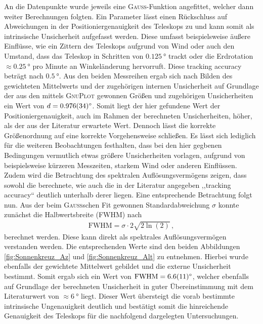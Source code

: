     An die Datenpunkte wurde jeweils eine \textsc{Gauß}-Funktion angefittet, welcher dann weiter Berechnungen folgten.
    Ein Parameter lässt einen Rückschluss auf Abweichungen in der Positioniergenauigkeit des Teleskops zu und kann somit als intrinsische Unsicherheit aufgefasst werden.
    Diese umfasst beispielsweise äußere Einflüsse, wie ein Zittern des Teleskops aufgrund von Wind oder auch den Umstand, dass das Teleskop in Schritten von $\SI{0.125}{\degree}$ trackt \cite{Usermanual} oder die Erdrotation $\approx \SI{0.25}{\degree}$ pro Minute an Winkeländerung hervorruft.
    Diese \dq tracking accuracy\dq{} beträgt nach \cite{Usermanual} $\SI{0.5}{\degree}$. 
    Aus den beiden Messreihen ergab sich nach Bilden des gewichteten Mittelwerts und der zugehörigen internen Unsicherheit auf Grundlage der aus den mittels \textsc{GnuPlot} gewonnen Größen und zugehörigen Unsicherheiten ein Wert von $d = \SI{0.976 \pm 0.034}{\degree}$.
    Somit liegt der hier gefundene Wert der Positioniergenauigkeit, auch im Rahmen der berechneten Unsicherheiten, höher, als der aus der Literatur erwartete Wert. 
    Dennoch lässt die korrekte Größenordnung auf eine korrekte Vorgehensweise schließen.
    Es lässt sich lediglich für die weiteren Beobachtungen festhalten, dass bei den hier gegbenen Bedingungen vermutlich etwas größere Unsicherheiten vorlagen, aufgrund von beispielsweise kürzeren Messzeiten, starkem Wind oder anderen Einflüssen.\\ 


    Zudem wird die Betrachtung des spektralen Auflösungsvermögens zeigen, dass sowohl die berechnete, wie auch die in der Literatur angegeben ,,tracking accuracy`` deutlich unterhalb derer liegen.
    Eine entsprechende Betrachtung folgt nun.
    Aus der beim \textsc{Gauß}schen Fit gewonnen Standardabweichung $\sigma$ konnte zunächst die Halbwertsbreite (FWHM) nach \cite{wiki:FWHM}
    \begin{align}
        \text{FWHM} = \sigma \cdot 2\sqrt{2\ln(2)} \, , \label{eq:FWHM}
    \end{align}
    berechnet werden.
    Diese kann direkt als spektrales Auflösungsvermögen verstanden werden.
    Die entsprechenden Werte sind den beiden Abbildungen \ref{fig:Sonnenkreuz_Az} und \ref{fig:Sonnenkreuz_Alt} zu entnehmen. Hierbei wurde ebenfalls der gewichtete Mittelwert gebildet und die externe Unsicherheit bestimmt.
    Somit ergab sich ein Wert von $\text{FWHM} = \SI{6.6 \pm 1.1}{\degree}$, welcher ebenfalls auf Grundlage der berechneten Unsicherheit in guter Übereinstimmung mit dem Literaturwert von $\approx \SI{6}{\degree}$ \cite{Usermanual} liegt. 
    Dieser Wert übersteigt die vorab bestimmte intrinsische Ungenauigkeit deutlich und bestätigt somit die hinreichende Genauigkeit des Teleskops für die nachfolgend dargelegten Untersuchungen.\\


